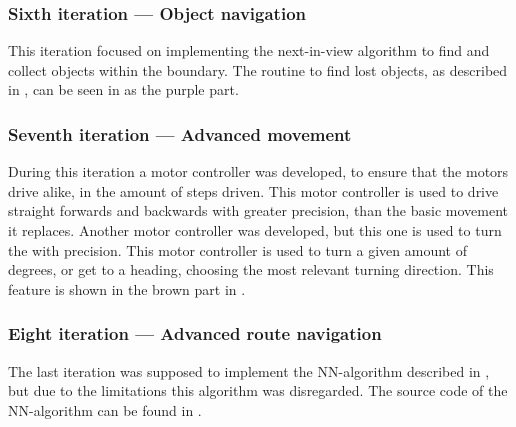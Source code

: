 \subsubsection{Sixth iteration --- Object navigation}
This iteration focused on implementing the next-in-view algorithm to find and collect objects within the boundary. The routine to find lost objects, as described in , can be seen in  as the purple part.


\subsubsection{Seventh iteration --- Advanced movement}
During this iteration a motor controller was developed, to ensure that the motors drive alike, in the amount of steps driven. This motor controller is used to drive straight forwards and backwards with greater precision, than the basic movement it replaces. Another motor controller was developed, but this one is used to turn the \projname{} with precision. This motor controller is used to turn a given amount of degrees, or get to a heading, choosing the most relevant turning direction. This feature is shown in the brown part in .


\subsubsection{Eight iteration --- Advanced route navigation}
The last iteration was supposed to implement the NN-algorithm described in , but due to the limitations this algorithm was disregarded. The source code of the NN-algorithm can be found in .






